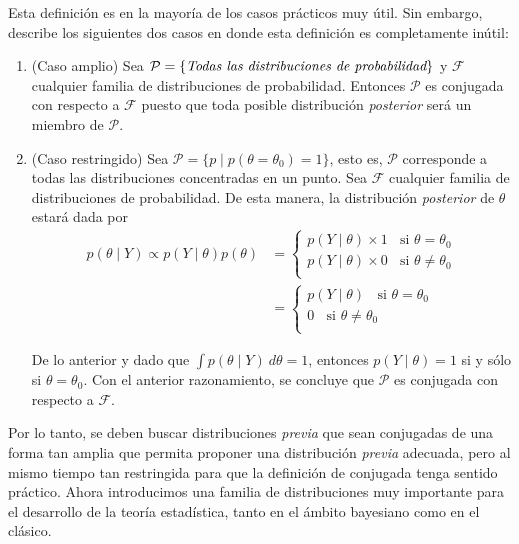 \documentclass[10pt,openright]{book}\usepackage[]{graphicx}\usepackage[]{color}
\begin{document}
Esta definición es en la mayoría de los casos prácticos muy útil. Sin embargo,  describe los siguientes dos casos en donde esta definición es completamente inútil:

\begin{enumerate}
\item (Caso amplio) Sea $\mathcal{P}=\{\emph{Todas las distribuciones de probabilidad}\}$ y $\mathcal{F}$ cualquier familia de distribuciones de probabilidad. Entonces $\mathcal{P}$ es conjugada con respecto a $\mathcal{F}$ puesto que toda posible distribución \emph{posterior} será un miembro de $\mathcal{P}$.
\item (Caso restringido) Sea $\mathcal{P}=\{p  \mid  p(\theta=\theta_0)=1\}$, esto es, $\mathcal{P}$ corresponde a todas las distribuciones concentradas en un punto. Sea $\mathcal{F}$ cualquier familia de distribuciones de probabilidad. De esta manera, la distribución \emph{posterior} de $\theta$ estará dada por
    \begin{align*}
    p(\theta \mid Y)\propto
    p(Y \mid \theta)p(\theta)
    &=
    \begin{cases}
    p(Y \mid \theta)\times 1 \ \ \ \ \text{si $\theta=\theta_0$}\\
    p(Y \mid \theta)\times 0 \ \ \ \ \text{si $\theta\neq\theta_0$}\\
    \end{cases}\\
    &=
    \begin{cases}
    p(Y \mid \theta) \ \ \ \ \text{si $\theta=\theta_0$}\\
    0           \ \ \ \ \text{si $\theta\neq\theta_0$}\\
    \end{cases}
    \end{align*}

    De lo anterior y dado que $\int p(\theta \mid Y)\ d\theta=1$, entonces $p(Y \mid \theta)=1$ si y sólo si $\theta=\theta_0$. Con el anterior razonamiento, se concluye que $\mathcal{P}$ es conjugada con respecto a $\mathcal{F}$.
\end{enumerate}

Por lo tanto, se deben buscar distribuciones \emph{previa} que sean conjugadas de una forma tan amplia que permita proponer una distribución \emph{previa} adecuada, pero al mismo tiempo tan restringida para que la definición de conjugada tenga sentido práctico. Ahora introducimos una familia de distribuciones muy importante para el desarrollo de la teoría estadística, tanto en el ámbito bayesiano como en el clásico.
\end{document}
